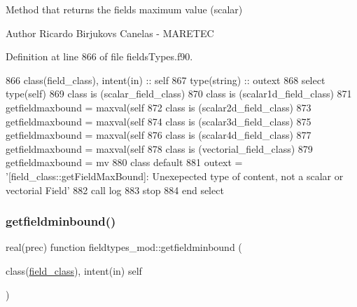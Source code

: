 Method that returns the field\textquotesingle{}s maximum value (scalar) 

\begin{DoxyAuthor}{Author}
Ricardo Birjukovs Canelas -\/ M\+A\+R\+E\+T\+EC 
\end{DoxyAuthor}


Definition at line 866 of file fields\+Types.\+f90.


\begin{DoxyCode}
866     \textcolor{keywordtype}{class}(field\_class), \textcolor{keywordtype}{intent(in)} :: self
867     \textcolor{keywordtype}{type}(string) :: outext
868     \textcolor{keywordflow}{select type}(self)
869 \textcolor{keywordflow}{    class is} (scalar\_field\_class)
870 \textcolor{keywordflow}{    class is} (scalar1d\_field\_class)
871         getfieldmaxbound = maxval(self%
872 \textcolor{keywordflow}{    class is} (scalar2d\_field\_class)
873         getfieldmaxbound = maxval(self%
874 \textcolor{keywordflow}{    class is} (scalar3d\_field\_class)
875         getfieldmaxbound = maxval(self%
876 \textcolor{keywordflow}{    class is} (scalar4d\_field\_class)
877         getfieldmaxbound = maxval(self%
878 \textcolor{keywordflow}{    class is} (vectorial\_field\_class)
879         getfieldmaxbound = mv
880 \textcolor{keywordflow}{        class default}
881         outext = \textcolor{stringliteral}{'[field\_class::getFieldMaxBound]: Unexepected type of content, not a scalar or vectorial
       Field'}
882         \textcolor{keyword}{call }log%
883         stop
884 \textcolor{keywordflow}{    end select}
\end{DoxyCode}
\mbox{\label{namespacefieldtypes__mod_aec092e7c0b82a7b3a828ae18af80b810}} 
\subsubsection{\texorpdfstring{getfieldminbound()}{getfieldminbound()}}
{\footnotesize\ttfamily real(prec) function fieldtypes\+\_\+mod\+::getfieldminbound (\begin{DoxyParamCaption}\item[{class(\mbox{\hyperlink{structfieldtypes__mod_1_1field__class}{field\+\_\+class}}), intent(in)}]{self }\end{DoxyParamCaption})\hspace{0.3cm}{\ttfamily [private]}}




